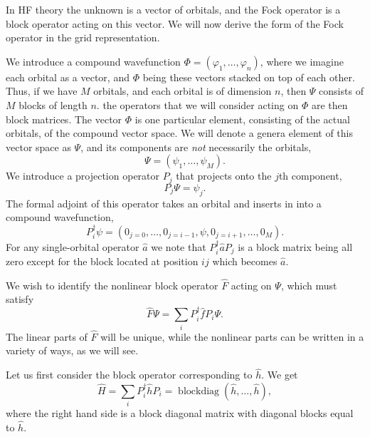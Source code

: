 \documentclass[12pt]{article}
\newcommand{\blockdiag}{\operatorname{blockdiag}}
\begin{document}
In HF theory the unknown is a vector of orbitals, and the Fock operator is a block operator acting on this vector. We will now derive the form of the Fock operator in the grid representation.

We introduce a compound wavefunction $\Phi = (\varphi_1,\ldots,\varphi_n)$, where we imagine each orbital as a vector, and $\Phi$ being these vectors stacked on top of each other. Thus, if we have $M$ orbitals, and each orbital is of dimension $n$, then $\Psi$ consists of $M$ blocks of length $n$. the operators that we will consider acting on $\Phi$ are then block matrices. The vector $\Phi$ is one particular element, consisting of the actual orbitals, of the compound vector space. We will denote a genera element of this vector space as $\Psi$, and its components are \emph{not} necessarily the orbitals,
\begin{equation}
    \Psi = (\psi_1,\ldots,\psi_M).
\end{equation}
We introduce a projection operator $P_j$ that projects onto the $j$th component,
\begin{equation}
    P_j \Psi = \psi_j.
\end{equation}
The formal adjoint of this operator takes an orbital and inserts in into a compound wavefunction,
\begin{equation}
    P_i^\dag \psi = (0_{j=0}, \ldots, 0_{j=i-1}, \psi, 0_{j=i+1},\ldots, 0_{M}).
\end{equation}
For any single-orbital operator $\hat{a}$ we note that $P_i^\dag \hat{a} P_j$ is a block matrix being all zero except for the block located at position $ij$ which becomes $\hat{a}$.

We wish to identify the nonlinear block operator $\hat{F}$ acting on $\Psi$, which must satisfy
\begin{equation}
    \hat{F} \Psi = \sum_i P_i^\dag \hat{f} P_i \Psi.
\end{equation}
The linear parts of $\hat{F}$ will be unique, while the nonlinear parts can be written in a variety of ways, as we will see.

Let us first consider the block operator corresponding to $\hat{h}$. We get
\begin{equation}
    \hat{H} = \sum_i P_i^\dag \hat{h} P_i = \blockdiag(\hat{h},\ldots,\hat{h}),
\end{equation}
where the right hand side is a block diagonal matrix with diagonal blocks equal to $\hat{h}$.
\end{document}
